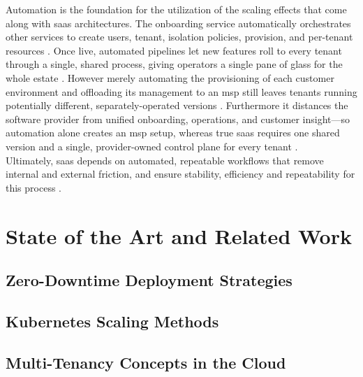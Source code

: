 \documentclass[11pt, a4paper, oneside, listof=totoc]{scrartcl}
\begin{document}
            Automation is the foundation for the utilization of the scaling effects that come along
            with \gls{saas} architectures.
            The onboarding service automatically orchestrates other services to
            create users, tenant, isolation policies, provision, and per-tenant resources
            \parencite[p.~14]{awsSaaSArchitectureFundamentals}.
            Once live, automated pipelines let new features roll to every tenant through a single,
            shared process, giving operators a single pane of glass for the whole estate
            \parencite[p.~10]{awsSaaSArchitectureFundamentals}.
            However merely automating the provisioning of each customer environment and offloading
            its management to an \gls{msp} still leaves tenants running potentially different,
            separately-operated versions \parencite[pp.~23--24]{awsSaaSArchitectureFundamentals}.
            Furthermore it distances the software provider from unified onboarding, operations, and
            customer insight—so automation alone creates an \gls{msp} setup, whereas true \gls{saas}
            requires one shared version and a single, provider-owned control plane for every tenant
            \parencite[pp.~23--24]{awsSaaSArchitectureFundamentals}.
            \\
            Ultimately, \gls{saas} depends on automated, repeatable workflows that remove internal
            and external friction, and ensure stability, efficiency and repeatability for this
            process \parencite[p.~14]{awsSaaSArchitectureFundamentals}.

    \section{State of the Art and Related Work}\label{sec:related}

        \subsection{Zero-Downtime Deployment Strategies}\label{subsec:zeroDowntime}

        \subsection{Kubernetes Scaling Methods}\label{subsec:k8sScaling}

        \subsection{Multi-Tenancy Concepts in the Cloud}\label{subsec:mtConcepts}
\end{document}
